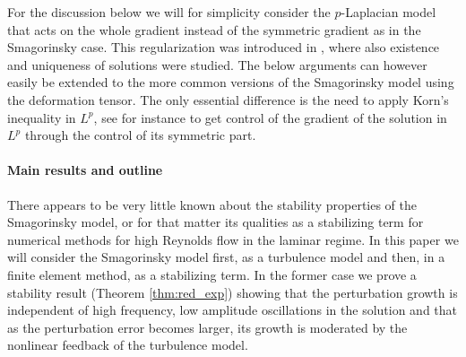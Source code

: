 \documentclass[10pt]{amsart}
\numberwithin{equation}{section}
\theoremstyle{definition}
\theoremstyle{remark}
\renewcommand{\(}{\bigl(}
\renewcommand{\)}{\bigr)}
\begin{document}
For the discussion below we will for simplicity consider the $p$-Laplacian model that acts
on the whole gradient instead of the symmetric gradient as in the
Smagorinsky case. This regularization was introduced
in \cite[Chap. 2, sec. 5]{Lions69}, where also existence and
uniqueness of solutions were studied. The below arguments can however easily be extended to the
more common versions of the Smagorinsky model using the deformation
tensor. The only essential difference is the need to apply Korn's
inequality in $L^p$, see for instance \cite[Chapter 7]{DD12} to get
control of the gradient of the solution in $L^p$ through the control
of its symmetric part.

\paragraph{{\bf {Main results and outline}}}

There appears to be very little known about the stability properties
of the Smagorinsky model, or for that matter its qualities as a
stabilizing term for numerical methods for high Reynolds flow in the
laminar regime. 
In this paper we will consider the Smagorinsky model first, as a
turbulence model and then, in a finite element method, as a
stabilizing term. In the former case we prove a stability result
(Theorem \ref{thm:red_exp})
showing that the perturbation growth is independent of high frequency,
low amplitude oscillations in the solution and that as the
perturbation error becomes larger, its growth is moderated by the
nonlinear feedback of the turbulence model.
\end{document}
